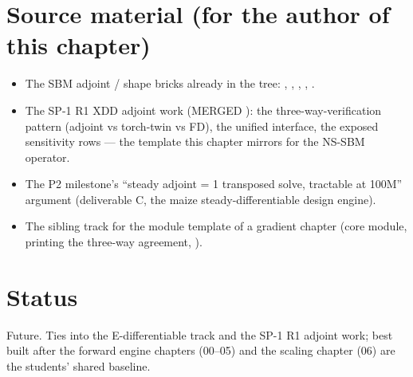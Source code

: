 \section*{Source material (for the author of this chapter)}
\begin{itemize}
\item The SBM adjoint / shape bricks already in the tree:
  , ,
  , , .
\item The SP-1 R1 XDD adjoint work (MERGED ): the
  three-way-verification pattern (adjoint vs torch-twin vs FD), the unified
   interface, the exposed sensitivity rows --- the template
  this chapter mirrors for the NS-SBM operator.
\item The P2 milestone's ``steady adjoint = 1 transposed solve, tractable at
  100M'' argument (deliverable C, the maize steady-differentiable design
  engine).
\item The sibling  track for the
  module template of a gradient chapter (core module,  printing
  the three-way agreement, ).
\end{itemize}

\section*{Status}
Future. Ties into the E-differentiable track and the SP-1 R1 adjoint work;
best built after the forward engine chapters (00--05) and the scaling
chapter (06) are the students' shared baseline.
